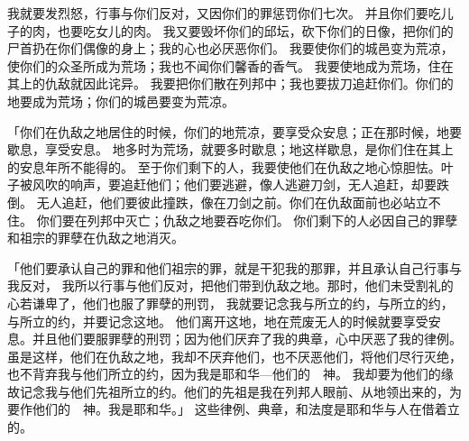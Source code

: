 {我就要发烈怒，行事与你们反对，又因你们的罪惩罚你们七次。
并且你们要吃儿子的肉，也要吃女儿的肉。
我又要毁坏你们的邱坛，砍下你们的日像，把你们的尸首扔在你们偶像的身上；我的心也必厌恶你们。
我要使你们的城邑变为荒凉，使你们的众圣所成为荒场；我也不闻你们馨香的香气。
我要使地成为荒场，住在其上的仇敌就因此诧异。
我要把你们散在列邦中；我也要拔刀追赶你们。你们的地要成为荒场；你们的城邑要变为荒凉。
\par }{\PP {}「你们在仇敌之地居住的时候，你们的地荒凉，要享受众安息；正在那时候，地要歇息，享受安息。
地多时为荒场，就要多时歇息；地这样歇息，是你们住在其上的安息年所不能得的。
至于你们剩下的人，我要使他们在仇敌之地心惊胆怯。叶子被风吹的响声，要追赶他们；他们要逃避，像人逃避刀剑，无人追赶，却要跌倒。
无人追赶，他们要彼此撞跌，像在刀剑之前。你们在仇敌面前也必站立不住。
你们要在列邦中灭亡；仇敌之地要吞吃你们。
你们剩下的人必因自己的罪孽和祖宗的罪孽在仇敌之地消灭。
\par }{\PP {}「他们要承认自己的罪和他们祖宗的罪，就是干犯我的那罪，并且承认自己行事与我反对，
我所以行事与他们反对，把他们带到仇敌之地。那时，他们未受割礼的心若谦卑了，他们也服了罪孽的刑罚，
我就要记念我与{}所立的约，与{}所立的约，与{}所立的约，并要记念这地。
他们离开这地，地在荒废无人的时候就要享受安息。并且他们要服罪孽的刑罚；因为他们厌弃了我的典章，心中厌恶了我的律例。
虽是这样，他们在仇敌之地，我却不厌弃他们，也不厌恶他们，将他们尽行灭绝，也不背弃我与他们所立的约，因为我是耶和华—他们的　神。
我却要为他们的缘故记念我与他们先祖所立的约。他们的先祖是我在列邦人眼前、从{}地领出来的，为要作他们的　神。我是耶和华。」
这些律例、典章，和法度是耶和华与{}人在{}借着{}立的。

}
